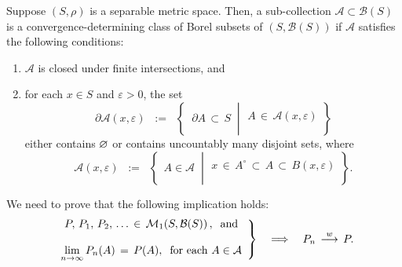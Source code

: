 \begin{theorem}
\mbox{}
\vskip 0.1cm
\noindent
Suppose $\left(S,\rho\right)$ is a {\color{red}separable} metric space.
Then, a sub-collection $\mathcal{A} \subset \mathcal{B}(S)$ is a
convergence-determining class of Borel subsets of
$\left(S,\mathcal{B}(S)\right)$ if $\mathcal{A}$ satisfies the following conditions:
\begin{enumerate}
\item	$\mathcal{A}$ is closed under finite intersections, and
\item	for each $x \in S$ and $\varepsilon > 0$, the set
		\begin{equation*}
		\partial\mathcal{A}(x,\varepsilon)
		\;\; := \;\;
		\left\{\;\;
		\partial A \,\subset\, S
		\;\;\left\vert\;
		\begin{array}{c}
			\\
			A \,\in\, \mathcal{A}(x,\varepsilon)
			\\ \\
		\end{array}
		\right.
		\right\}
		\end{equation*}
		either contains $\varnothing$ or contains uncountably many disjoint sets,
		where
		\begin{equation*}
		\mathcal{A}(x,\varepsilon)
		\;\; := \;\;
		\left\{\;\,
		A \in \mathcal{A}
		\;\;\left\vert\;
		\begin{array}{c}
			\\
			x \,\in\, A^{\circ} \,\subset\, A \,\subset\, B(x,\varepsilon)
			\\ \\
		\end{array}
		\right.
		\right\}.
		\end{equation*}		
\end{enumerate}
\end{theorem}
\proof
We need to prove that the following implication holds:
\begin{equation*}
\left.
\begin{array}{c}
	P,\,P_{1},\,P_{2},\,\ldots\,\in\,\mathcal{M}_{1}\!\left(S,\mathcal{B}(S)\right),\;\;\textnormal{and}
	\\ \\
	\underset{n\rightarrow\infty}{\lim}\,P_{n}(A) \,=\, P(A),\;\;\textnormal{for each $A \in \mathcal{A}$}
\end{array}
\right\}
\quad\Longrightarrow\quad
P_{n} \,\overset{w}{\longrightarrow}\, P.
\end{equation*}
